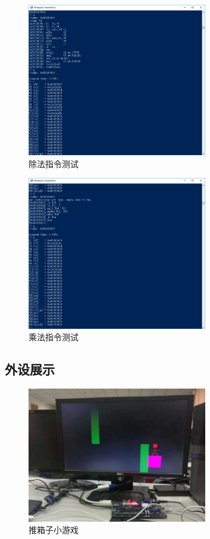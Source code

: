 \documentclass[12pt, utf8, hyperref]{ctexart}
\begin{document}
\begin{figure}[H]
    \centering
    \includegraphics[width=0.7\textwidth]{screenshots/div.png}
    \caption{除法指令测试}
\end{figure}

\begin{figure}[H]
    \centering
    \includegraphics[width=0.7\textwidth]{screenshots/mul.png}
    \caption{乘法指令测试}
\end{figure}

\subsection{外设展示}
\begin{figure}[H]
    \centering
    \includegraphics[width=0.7\textwidth]{screenshots/sokoban.JPG}
    \caption{推箱子小游戏}
\end{figure}
\end{document}
